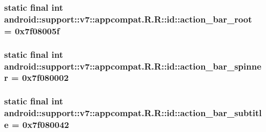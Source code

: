 \hypertarget{classandroid_1_1support_1_1v7_1_1appcompat_1_1_r_1_1id_03a42817bf4aaea900863666b0a0ed17}{
\subsubsection[{action\_\-bar\_\-root}]{\setlength{\rightskip}{0pt plus 5cm}static final int android::support::v7::appcompat.R.R::id::action\_\-bar\_\-root = 0x7f08005f}}
\label{classandroid_1_1support_1_1v7_1_1appcompat_1_1_r_1_1id_03a42817bf4aaea900863666b0a0ed17}


\hypertarget{classandroid_1_1support_1_1v7_1_1appcompat_1_1_r_1_1id_040742d9504ec32b17d5c6457fb6212a}{
\subsubsection[{action\_\-bar\_\-spinner}]{\setlength{\rightskip}{0pt plus 5cm}static final int android::support::v7::appcompat.R.R::id::action\_\-bar\_\-spinner = 0x7f080002}}
\label{classandroid_1_1support_1_1v7_1_1appcompat_1_1_r_1_1id_040742d9504ec32b17d5c6457fb6212a}


\hypertarget{classandroid_1_1support_1_1v7_1_1appcompat_1_1_r_1_1id_e0ce1554d9c0ed30f622d57aebad163a}{
\subsubsection[{action\_\-bar\_\-subtitle}]{\setlength{\rightskip}{0pt plus 5cm}static final int android::support::v7::appcompat.R.R::id::action\_\-bar\_\-subtitle = 0x7f080042}}
\label{classandroid_1_1support_1_1v7_1_1appcompat_1_1_r_1_1id_e0ce1554d9c0ed30f622d57aebad163a}



